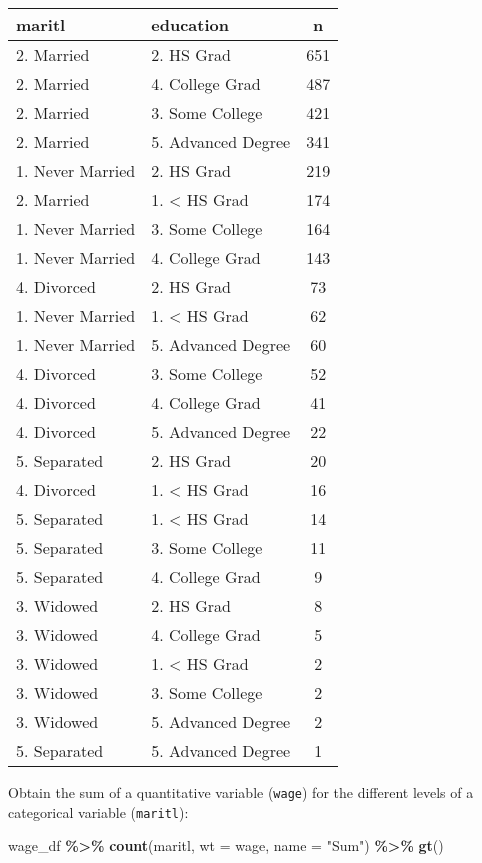\documentclass[
]{book}
\newenvironment{Shaded}{\begin{snugshade}}{\end{snugshade}}
\newcommand{\DataTypeTok}[1]{\textcolor[rgb]{0.13,0.29,0.53}{#1}}
\newcommand{\KeywordTok}[1]{\textcolor[rgb]{0.13,0.29,0.53}{\textbf{#1}}}
\newcommand{\NormalTok}[1]{#1}
\newcommand{\OperatorTok}[1]{\textcolor[rgb]{0.81,0.36,0.00}{\textbf{#1}}}
\newcommand{\StringTok}[1]{\textcolor[rgb]{0.31,0.60,0.02}{#1}}
\begin{document}
\captionsetup[table]{labelformat=empty,skip=1pt}
\begin{longtable}{llc}
\toprule
maritl & education & n \\ 
\midrule
2. Married & 2. HS Grad & 651 \\ 
2. Married & 4. College Grad & 487 \\ 
2. Married & 3. Some College & 421 \\ 
2. Married & 5. Advanced Degree & 341 \\ 
1. Never Married & 2. HS Grad & 219 \\ 
2. Married & 1. < HS Grad & 174 \\ 
1. Never Married & 3. Some College & 164 \\ 
1. Never Married & 4. College Grad & 143 \\ 
4. Divorced & 2. HS Grad & 73 \\ 
1. Never Married & 1. < HS Grad & 62 \\ 
1. Never Married & 5. Advanced Degree & 60 \\ 
4. Divorced & 3. Some College & 52 \\ 
4. Divorced & 4. College Grad & 41 \\ 
4. Divorced & 5. Advanced Degree & 22 \\ 
5. Separated & 2. HS Grad & 20 \\ 
4. Divorced & 1. < HS Grad & 16 \\ 
5. Separated & 1. < HS Grad & 14 \\ 
5. Separated & 3. Some College & 11 \\ 
5. Separated & 4. College Grad & 9 \\ 
3. Widowed & 2. HS Grad & 8 \\ 
3. Widowed & 4. College Grad & 5 \\ 
3. Widowed & 1. < HS Grad & 2 \\ 
3. Widowed & 3. Some College & 2 \\ 
3. Widowed & 5. Advanced Degree & 2 \\ 
5. Separated & 5. Advanced Degree & 1 \\ 
\bottomrule
\end{longtable}

Obtain the sum of a quantitative variable (\texttt{wage}) for the different levels of a categorical variable (\texttt{maritl}):

\begin{Shaded}
\begin{Highlighting}[]
\NormalTok{wage\_df }\OperatorTok{\%\textgreater{}\%}\StringTok{  }
\StringTok{  }\KeywordTok{count}\NormalTok{(maritl,}
        \DataTypeTok{wt =}\NormalTok{ wage,}
        \DataTypeTok{name =} \StringTok{"Sum"}\NormalTok{) }\OperatorTok{\%\textgreater{}\%}\StringTok{ }
\StringTok{  }\KeywordTok{gt}\NormalTok{()}
\end{Highlighting}
\end{Shaded}
\end{document}
